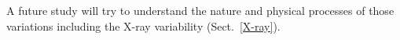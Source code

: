 \documentclass[fleqn,usenatbib]{mnras}
\begin{document}
A future study will try to understand the nature and physical processes of those variations including the X-ray variability (Sect.~\ref{X-ray}).





\end{document}
